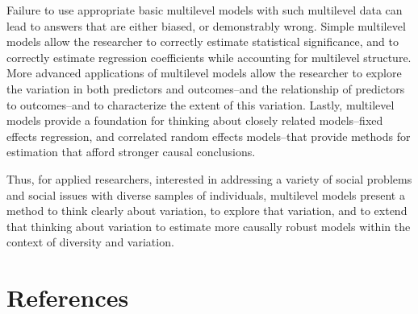 \documentclass[
  letterpaper,
  DIV=11,
  numbers=noendperiod]{scrreprt}
\begin{document}
Failure to use appropriate basic multilevel models with such multilevel
data can lead to answers that are either biased, or demonstrably wrong.
Simple multilevel models allow the researcher to correctly estimate
statistical significance, and to correctly estimate regression
coefficients while accounting for multilevel structure.
 More advanced applications of multilevel models
allow the researcher to explore the variation in both predictors and
outcomes--and the relationship of predictors to outcomes--and to
characterize the extent of this variation. Lastly, multilevel models
provide a foundation for thinking about closely related models--fixed
effects regression, and correlated random effects models--that provide
methods for estimation that afford stronger causal conclusions.

Thus, for applied researchers, interested in addressing a variety of
social problems and social issues with diverse samples of individuals,
multilevel models present a method to think clearly about variation, to
explore that variation, and to extend that thinking about variation to
estimate more causally robust models within the context of diversity and
variation. 


\chapter*{References}\label{references}

\end{document}
